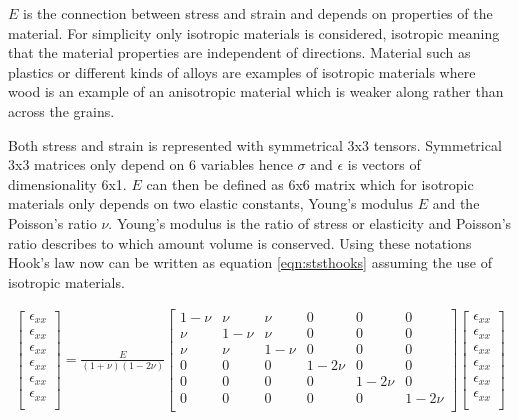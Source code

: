 \documentclass[10pt,a4paper]{article}
\begin{document}
 $E$ is the connection between stress and strain and depends on properties of the material. For simplicity only isotropic materials is considered, isotropic meaning that the material properties are independent of directions. Material such as plastics or different kinds of alloys are examples of isotropic materials where wood is an example of an anisotropic material which is weaker along rather than across the grains.

Both stress and strain is represented with symmetrical 3x3 tensors. Symmetrical 3x3 matrices only depend on 6 variables hence
$\sigma$ and $\epsilon$ is vectors of dimensionality 6x1. $E$ can then be defined as 6x6 matrix which for isotropic materials only depends on two elastic constants, Young's modulus $E$ and the Poisson's ratio $\nu$. Young's modulus is the ratio of stress or elasticity and Poisson's ratio describes to which amount volume is conserved. Using these notations Hook's law now can be written as equation \ref{eqn:ststhooks} assuming the use of isotropic materials.

\begin{eqnarray}\label{eqn:ststhooks}
\left[ \begin{array}{c}
\epsilon_{xx} \\
\epsilon_{xx} \\
\epsilon_{xx} \\
\epsilon_{xx} \\
\epsilon_{xx} \\
\epsilon_{xx} \\
\end{array} \right] = \frac{E}{(1+\nu)(1-2\nu)}
\left[ \begin{array}{cccccc}
1-\nu & \nu & \nu & 0 & 0 & 0\\
\nu & 1-\nu & \nu & 0 & 0 & 0\\
\nu & \nu & 1-\nu & 0 & 0 & 0\\
0 & 0 & 0 & 1-2\nu & 0 & 0\\
0 & 0 & 0 & 0 & 1-2\nu & 0\\
0 & 0 & 0 & 0 & 0 & 1-2\nu\\
 \end{array} \right]
\left[ \begin{array}{c}
\epsilon_{xx} \\
\epsilon_{xx} \\
\epsilon_{xx} \\
\epsilon_{xx} \\
\epsilon_{xx} \\
\epsilon_{xx} \\
\end{array} \right]
\end{eqnarray}
\end{document}
